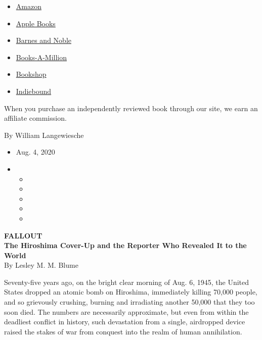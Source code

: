 \begin{itemize}
\tightlist
\item
  \href{https://www.amazon.com/gp/search?index=books\&tag=NYTBSREV-20\&field-keywords=Fallout\%3A+The+Hiroshima+Cover-Up+and+the+Reporter+Who+Revealed+It+to+the+World+Lesley+M.M.+Blume}{Amazon}
\item
  \href{https://du-gae-books-dot-nyt-du-prd.appspot.com/buy?title=Fallout\%3A+The+Hiroshima+Cover-Up+and+the+Reporter+Who+Revealed+It+to+the+World\&author=Lesley+M.M.+Blume}{Apple
  Books}
\item
  \href{https://www.anrdoezrs.net/click-7990613-11819508?url=https\%3A\%2F\%2Fwww.barnesandnoble.com\%2Fw\%2F\%3Fean\%3D9781982128531}{Barnes
  and Noble}
\item
  \href{https://www.anrdoezrs.net/click-7990613-35140?url=https\%3A\%2F\%2Fwww.booksamillion.com\%2Fp\%2FFallout\%253A\%2BThe\%2BHiroshima\%2BCover-Up\%2Band\%2Bthe\%2BReporter\%2BWho\%2BRevealed\%2BIt\%2Bto\%2Bthe\%2BWorld\%2FLesley\%2BM.M.\%2BBlume\%2F9781982128531}{Books-A-Million}
\item
  \href{https://bookshop.org/a/3546/9781982128531}{Bookshop}
\item
  \href{https://www.indiebound.org/book/9781982128531?aff=NYT}{Indiebound}
\end{itemize}

When you purchase an independently reviewed book through our site, we
earn an affiliate commission.

By William Langewiesche

\begin{itemize}
\item
  Aug. 4, 2020
\item
  \begin{itemize}
  \item
  \item
  \item
  \item
  \item
  \end{itemize}
\end{itemize}

\textbf{FALLOUT}\\
\textbf{The Hiroshima Cover-Up and the Reporter Who Revealed It}
\textbf{to the World}\\
By Lesley M. M. Blume

Seventy-five years ago, on the bright clear morning of Aug. 6, 1945, the
United States dropped an atomic bomb on Hiroshima, immediately killing
70,000 people, and so grievously crushing, burning and irradiating
another 50,000 that they too soon died. The numbers are necessarily
approximate, but even from within the deadliest conflict in history,
such devastation from a single, airdropped device raised the stakes of
war from conquest into the realm of human annihilation.

